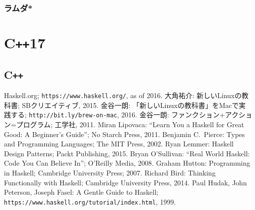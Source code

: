 \documentclass[twocolumn]{jsbook}
\newcommand{\programminglanguage}[1]{\textsf{#1}}
\newcommand{\cxx}{\programminglanguage{C}\texttt{++}}
\begin{document}

\section{ラムダ*}

\part{\cxx17}
\chapter{\cxx}

\begin{thebibliography}{99}
 Haskell.org; \texttt{https://www.haskell.org/}, as of 2016.
 大角祐介: 新しいLinuxの教科書; SBクリエイティブ, 2015.
 金谷一朗: 「新しいLinuxの教科書」をMacで実践する; \texttt{http://bit.ly/brew-on-mac}, 2016.
 金谷一朗: ファンクション+アクション=プログラム; 工学社, 2011.
Miran Lipovaca: ``Learn You a Haskell for Great Good: A Beginner's Guide''; No Starch Press, 2011.
 Benjamin C.~Pierce: Types and Programming Languages; The MIT Press, 2002.
 Ryan Lemmer: Haskell Design Patterns; Packt Publishing, 2015.
 Bryan O'Sullivan: ``Real World Haskell: Code You Can Believe In''; O'Reilly Media, 2008.
 Graham Hutton: Programming in Haskell; Cambridge University Press; 2007.
 Richard Bird: Thinking Functionally with Haskell; Cambridge University Press, 2014.
 Paul Hudak, John Peterson, Joseph Fasel: A Gentle Guide to Haskell; \texttt{https://www.haskell.org/tutorial/index.html}, 1999.
\end{thebibliography}
\end{document}
